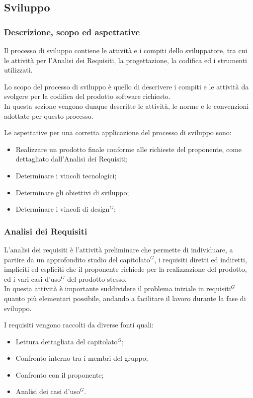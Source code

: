 \subsection{Sviluppo}

\subsubsection{Descrizione, scopo ed aspettative}

Il processo di sviluppo contiene le attività e i compiti dello sviluppatore, tra cui le attività per l’Analisi dei Requisiti, la progettazione, la codifica ed i strumenti utilizzati.

Lo scopo del processo di sviluppo è quello di descrivere i compiti e le attività da svolgere per la codifica del prodotto software richiesto. \\
In questa sezione vengono dunque descritte le attività, le norme e le convenzioni adottate per questo processo.

Le aspettative per una corretta applicazione del processo di sviluppo sono:
\begin{itemize}
    \item Realizzare un prodotto finale conforme alle richieste del proponente, come dettagliato dall'Analisi dei Requisiti;
    \item Determinare i vincoli tecnologici;
    \item Determinare gli obiettivi di sviluppo;
    \item Determinare i vincoli di design$^{G}$;
\end{itemize}
\subsubsection{Analisi dei Requisiti}


L’analisi dei requisiti è l’attività preliminare che permette di individuare, a partire da un approfondito studio del capitolato$^{G}$, i requisiti diretti ed indiretti, 
impliciti ed espliciti che il proponente richiede per la realizzazione del prodotto, ed i vari casi d’uso$^{G}$ del prodotto stesso. \\
In questa attività è importante suddividere il problema iniziale in requisiti$^{G}$ quanto più elementari possibile, andando a facilitare il lavoro durante la fase di sviluppo.


    I requisiti vengono raccolti da diverse fonti quali:
    \begin{itemize}
        \item Lettura dettagliata del capitolato$^{G}$;
        \item Confronto interno tra i membri del gruppo;
        \item Confronto con il proponente;
        \item Analisi dei casi d’uso$^{G}$.
    \end{itemize}





 